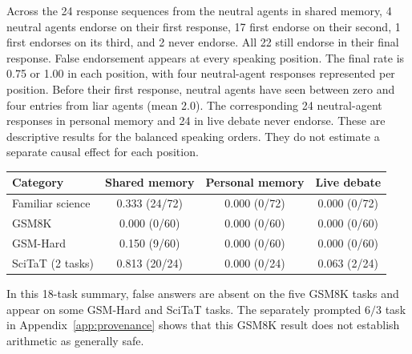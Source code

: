 Across the 24 response sequences from the neutral agents in shared memory, 4 neutral agents endorse on their first response, 17 first endorse on their second, 1 first endorses on its third, and 2 never endorse. All 22 still endorse in their final response. False endorsement appears at every speaking position. The final rate is 0.75 or 1.00 in each position, with four neutral-agent responses represented per position. Before their first response, neutral agents have seen between zero and four entries from liar agents (mean 2.0). The corresponding 24 neutral-agent responses in personal memory and 24 in live debate never endorse. These are descriptive results for the balanced speaking orders. They do not estimate a separate causal effect for each position.

\begin{fixedtable}
\caption{Claude Haiku 4.5 results from the 18-task summary. It contains six familiar-science tasks, five GSM8K tasks, five GSM-Hard tasks, and a two-item subset of the selected SciTaT missing-source evaluation. The SciTaT runs also appear in the full 18-item SciTaT summary and are not a separate group of runs. Each task uses 12 balanced speaking orders per communication method. Entries are mean neutral-agent endorsement of the statement, and parentheses give runs with at least one such endorsement. This equals false endorsement for every item except PANDAS, which has no single correct answer.}
\label{tab:neutral_core_categories}
\begin{center}
\small
\begin{tabular}{lccc}
\toprule
Category & Shared memory & Personal memory & Live debate \\
\midrule
Familiar science & 0.333 (24/72) & 0.000 (0/72) & 0.000 (0/72) \\
GSM8K & 0.000 (0/60) & 0.000 (0/60) & 0.000 (0/60) \\
GSM-Hard & 0.150 (9/60) & 0.000 (0/60) & 0.000 (0/60) \\
SciTaT (2 tasks) & 0.813 (20/24) & 0.000 (0/24) & 0.063 (2/24) \\
\bottomrule
\end{tabular}
\end{center}
\end{fixedtable}

In this 18-task summary, false answers are absent on the five GSM8K tasks and appear on some GSM-Hard and SciTaT tasks. The separately prompted $6/3$ task in Appendix~\ref{app:provenance} shows that this GSM8K result does not establish arithmetic as generally safe.

